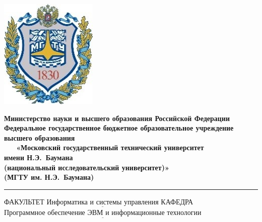 \documentclass[12pt, a4paper]{report}
\begin{document}
\begin{titlepage}
	\noindent \begin{minipage}{0.15\textwidth}
	\includegraphics[width=\linewidth]{bauman_logo}
	\end{minipage}
	\footnotesize\noindent \begin{minipage}{0.8\textwidth}\centering
		\textbf{Министерство науки и высшего образования Российской Федерации}\\
		\textbf{Федеральное государственное бюджетное образовательное учреждение}\\
		\textbf{высшего образования}\\
		\textbf{~~~«Московский государственный технический университет}\\
		\textbf{имени Н.Э.~Баумана}\\
		\textbf{(национальный исследовательский университет)»}\\
		\textbf{(МГТУ им. Н.Э.~Баумана)}
	\end{minipage}
	
	\noindent\rule{17cm}{3pt}
	\newline\newline
	\large\noindent ФАКУЛЬТЕТ $\underline{\text{Информатика и системы управления}}$ \newline\newline
	\noindent КАФЕДРА $\underline{\text{Программное обеспечение ЭВМ и информационные технологии}}$\newline\newline\newline\newline\newline
	

\end{titlepage}
\end{document}
